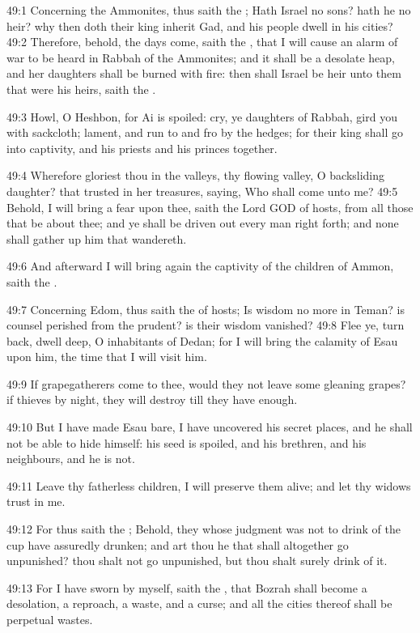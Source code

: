 49:1 Concerning the Ammonites, thus saith the \LORD; Hath Israel no sons?  hath he no heir? why then doth their king inherit Gad, and his people dwell in his cities?  49:2 Therefore, behold, the days come, saith the \LORD, that I will cause an alarm of war to be heard in Rabbah of the Ammonites; and it shall be a desolate heap, and her daughters shall be burned with fire: then shall Israel be heir unto them that were his heirs, saith the \LORD.

49:3 Howl, O Heshbon, for Ai is spoiled: cry, ye daughters of Rabbah, gird you with sackcloth; lament, and run to and fro by the hedges; for their king shall go into captivity, and his priests and his princes together.

49:4 Wherefore gloriest thou in the valleys, thy flowing valley, O backsliding daughter? that trusted in her treasures, saying, Who shall come unto me?  49:5 Behold, I will bring a fear upon thee, saith the Lord GOD of hosts, from all those that be about thee; and ye shall be driven out every man right forth; and none shall gather up him that wandereth.

49:6 And afterward I will bring again the captivity of the children of Ammon, saith the \LORD.

49:7 Concerning Edom, thus saith the \LORD of hosts; Is wisdom no more in Teman? is counsel perished from the prudent? is their wisdom vanished?  49:8 Flee ye, turn back, dwell deep, O inhabitants of Dedan; for I will bring the calamity of Esau upon him, the time that I will visit him.

49:9 If grapegatherers come to thee, would they not leave some gleaning grapes? if thieves by night, they will destroy till they have enough.

49:10 But I have made Esau bare, I have uncovered his secret places, and he shall not be able to hide himself: his seed is spoiled, and his brethren, and his neighbours, and he is not.

49:11 Leave thy fatherless children, I will preserve them alive; and let thy widows trust in me.

49:12 For thus saith the \LORD; Behold, they whose judgment was not to drink of the cup have assuredly drunken; and art thou he that shall altogether go unpunished? thou shalt not go unpunished, but thou shalt surely drink of it.

49:13 For I have sworn by myself, saith the \LORD, that Bozrah shall become a desolation, a reproach, a waste, and a curse; and all the cities thereof shall be perpetual wastes.

